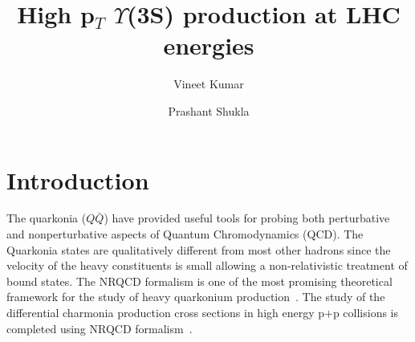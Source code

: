 \documentclass[twocolumn,amsmath,amssymb]{snp}
\begin{document}
\title{\Large High p$_{T}$ $\Upsilon$(3S) production at LHC energies} 
\author{\large Vineet Kumar}
\author{\large Prashant Shukla}
\maketitle
\section*{Introduction}
The quarkonia ($Q\bar Q$) have provided useful tools for probing both 
perturbative and nonperturbative aspects of Quantum Chromodynamics (QCD). 
The Quarkonia states are qualitatively different from most other hadrons since 
the velocity of the heavy constituents is small allowing a 
non-relativistic treatment of bound states. The NRQCD formalism is one 
of the most promising theoretical framework for the study of heavy quarkonium 
production~\cite{Bodwin:1994jh}. The study of the differential charmonia production 
cross sections in high energy p+p collisions is completed using 
NRQCD formalism~\cite{Kumar:2016ojy}.
\end{document}
